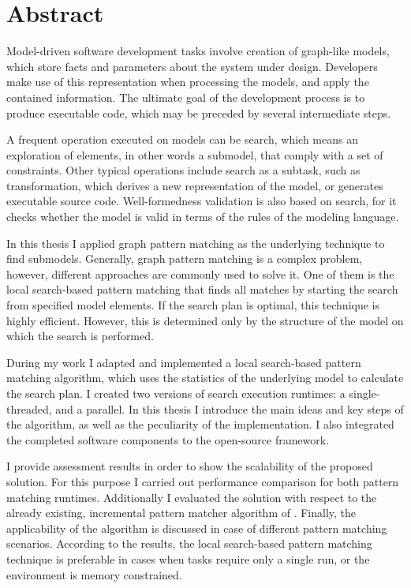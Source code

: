 \chapter*{Abstract}

Model-driven software development tasks involve creation of graph-like models, which store facts and parameters about the system under design. Developers make use of this representation when processing the models, and apply the contained information. The ultimate goal of the development process is to produce executable code, which may be preceded by several intermediate steps.

A frequent operation executed on models can be search, which means an exploration of elements, in other words a submodel, that comply with a set of constraints. Other typical operations include search as a subtask, such as transformation, which derives a new representation of the model, or generates executable source code. Well-formedness validation is also based on search, for it checks whether the model is valid in terms of the rules of the modeling language. 

In this thesis I applied graph pattern matching as the underlying technique to find submodels. Generally, graph pattern matching is a complex problem, however, different approaches are commonly used to solve it. One of them is the local search-based pattern matching that finds all matches by starting the search from specified model elements. If the search plan is optimal, this technique is highly efficient. However, this is determined only by the structure of the model on which the search is performed.

During my work I adapted and implemented a local search-based pattern matching algorithm, which uses the statistics of the underlying model to calculate the search plan. I created two versions of search execution runtimes: a single-threaded, and a parallel. In this thesis I introduce the main ideas and key steps of the algorithm, as well as the peculiarity of the implementation. I also integrated the completed software components to the open-source \eiq framework.

I provide assessment results in order to show the scalability of the proposed solution. For this purpose I carried out performance comparison for both pattern matching runtimes. Additionally I evaluated the solution with respect to the already existing, incremental pattern matcher algorithm of \eiq. Finally, the applicability of the algorithm is discussed in case of different pattern matching scenarios. According to the results, the local search-based pattern matching technique is preferable in cases when tasks require only a single run, or the environment is memory constrained. 


\vfill
\selectthesislanguage
\clearpage\null\newpage

\setcounter{romanPage}{\value{page}}
